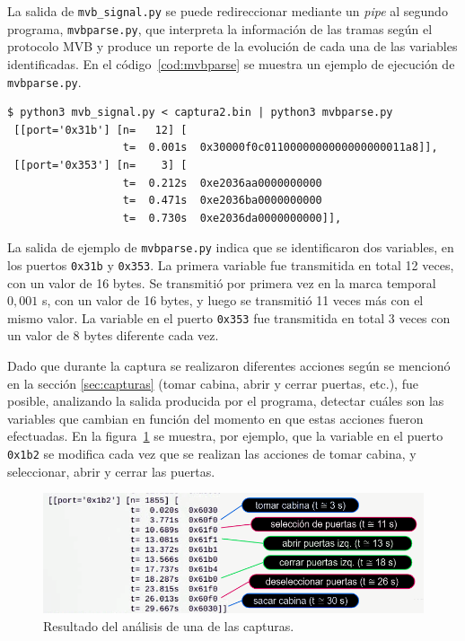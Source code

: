 La salida de \texttt{mvb\_signal.py} se puede redireccionar mediante un \textit{pipe} al segundo programa, \texttt{mvbparse.py}, que interpreta la información de las tramas según el protocolo MVB y produce un reporte de la evolución de cada una de las variables identificadas. En el código~\ref{cod:mvbparse} se muestra un ejemplo de ejecución de \texttt{mvbparse.py}.

\begin{lstlisting}[label=cod:mvbparse,caption=Ejemplo de ejecución de \texttt{mvbparse.py}.,float=htbp,basicstyle=\footnotesize\ttfamily]
$ python3 mvb_signal.py < captura2.bin | python3 mvbparse.py
 [[port='0x31b'] [n=   12] [
                  t=  0.001s  0x30000f0c0110000000000000000011a8]],
 [[port='0x353'] [n=    3] [
                  t=  0.212s  0xe2036aa0000000000
                  t=  0.471s  0xe2036ba0000000000
                  t=  0.730s  0xe2036da0000000000]],
\end{lstlisting}

La salida de ejemplo de \texttt{mvbparse.py} indica que se identificaron dos variables, en los puertos \texttt{0x31b} y \texttt{0x353}.
La primera variable fue transmitida en total 12 veces, con un valor de 16 bytes. Se transmitió por primera vez en la marca temporal $0{,}001$ s, con un valor de 16 bytes, y luego se transmitió 11 veces más con el mismo valor.
La variable en el puerto \texttt{0x353} fue transmitida en total 3 veces con un valor de 8 bytes diferente cada vez.

Dado que durante la captura se realizaron diferentes acciones según se mencionó en la sección \ref{sec:capturas} (tomar cabina, abrir y cerrar puertas, etc.), fue posible, analizando la salida producida por el programa, detectar cuáles son las variables que cambian en función del momento en que estas acciones fueron efectuadas. En la figura~\ref{fig:analisis-captura} se muestra, por ejemplo, que la variable en el puerto \texttt{0x1b2} se modifica cada vez que se realizan las acciones de tomar cabina, y seleccionar, abrir y cerrar las puertas.

\begin{figure}[htbp]
	\centering
	\includegraphics[width=\textwidth]{./Figures/analisis-captura.png}
	\caption[Resultado del análisis de una de las capturas.]{Resultado del análisis de una de las capturas.}
    \label{fig:analisis-captura}
\end{figure}

